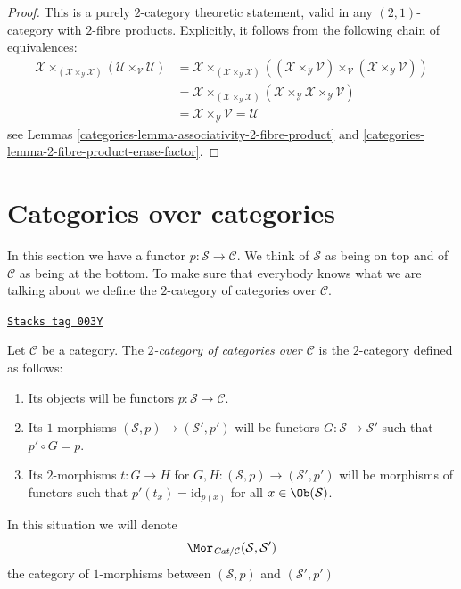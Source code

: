 \begin{proof}

This is a purely $2$-category theoretic statement, valid in any
$(2, 1)$-category with $2$-fibre products. Explicitly, it follows
from the following chain of equivalences:
\begin{align*}
\mathcal{X} \times_{(\mathcal{X} \times_\mathcal{Y} \mathcal{X})}
(\mathcal{U} \times_\mathcal{V} \mathcal{U})
& =
\mathcal{X} \times_{(\mathcal{X} \times_\mathcal{Y} \mathcal{X})}
((\mathcal{X} \times_\mathcal{Y} \mathcal{V})
\times_\mathcal{V} (\mathcal{X} \times_\mathcal{Y} \mathcal{V})) \\
& =
\mathcal{X} \times_{(\mathcal{X} \times_\mathcal{Y} \mathcal{X})}
(\mathcal{X} \times_\mathcal{Y} \mathcal{X}
\times_\mathcal{Y} \mathcal{V}) \\
& =
\mathcal{X} \times_\mathcal{Y} \mathcal{V} = \mathcal{U}
\end{align*}
see
Lemmas \ref{categories-lemma-associativity-2-fibre-product} and
\ref{categories-lemma-2-fibre-product-erase-factor}.
\end{proof}

\section{Categories over categories}
\label{categories-section-categories-over-categories}
In this section we have a functor $p : \mathcal{S} \to \mathcal{C}$.
We think of $\mathcal{S}$ as being on top and of $\mathcal{C}$ as being
at the bottom. To make sure that everybody knows what we are talking about
we define the $2$-category of categories over $\mathcal{C}$.

\begin{definition}
\label{categories-definition-categories-over-C}
\href{https://stacks.math.columbia.edu/tag/003Y}{\texttt{Stacks tag 003Y}}

Let $\mathcal{C}$ be a category.
The {\it $2$-category of categories over $\mathcal{C}$}
is the $2$-category defined as follows:
\begin{enumerate}
\item Its objects will be functors $p : \mathcal{S} \to \mathcal{C}$.
\item Its $1$-morphisms $(\mathcal{S}, p) \to (\mathcal{S}', p')$
will be functors $G : \mathcal{S} \to \mathcal{S}'$ such that
$p' \circ G = p$.
\item Its $2$-morphisms $t : G \to H$ for
$G, H : (\mathcal{S}, p) \to (\mathcal{S}', p')$
will be morphisms of functors
such that $p'(t_x) = \text{id}_{p(x)}$
for all $x \in \Ob(\mathcal{S})$.
\end{enumerate}
In this situation we will denote
$$
\Mor_{\textit{Cat}/\mathcal{C}}(\mathcal{S}, \mathcal{S}')
$$
the category of $1$-morphisms between
$(\mathcal{S}, p)$ and $(\mathcal{S}', p')$
\end{definition}

